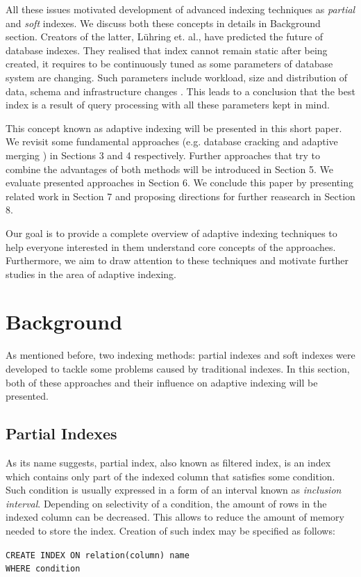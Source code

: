 \documentclass[10pt, conference, compsocconf]{IEEEtran}
\begin{document}
All these issues motivated development of advanced indexing techniques as \textit{partial} \cite{partial1} and \textit{soft} \cite{soft_indexes} indexes. We discuss both these concepts in details in Background section. Creators of the latter, L\"uhring et. al., have predicted the future of database indexes. They realised that index cannot remain static after being created, it requires to be continuously tuned as some parameters of database system are changing. Such parameters include workload, size and distribution of data, schema and infrastructure changes  \cite{soft_indexes}. This leads to a conclusion that the best index is a result of query processing with all these parameters kept in mind.

This concept known as adaptive indexing will be presented in this short paper. We revisit some fundamental approaches (e.g. database cracking \cite{cracking} and adaptive merging \cite{merging}) in Sections 3 and 4 respectively. Further approaches that try to combine the advantages of both methods will be introduced in Section 5. We evaluate presented approaches in Section 6. We conclude this paper by presenting related work in Section 7 and proposing directions for further reasearch in Section 8.

Our goal is to provide a complete overview of adaptive indexing techniques to help everyone interested in them understand core concepts of the approaches. Furthermore, we aim to draw attention to these techniques and motivate further studies in the area of adaptive indexing.

\section{Background}
As mentioned before, two indexing methods: partial indexes \cite{partial1} and soft indexes \cite{soft_indexes} were developed to tackle some problems caused by traditional indexes. In this section, both of these approaches and their influence on adaptive indexing will be presented.
\subsection{Partial Indexes}
As its name suggests, partial index, also known as filtered index, is an index which contains only part of the indexed column that satisfies some condition. Such condition is usually expressed in a form of an interval known as \textit{inclusion interval}. Depending on selectivity of a condition, the amount of rows in the indexed column can be decreased. This allows to reduce the amount of memory needed to store the index. Creation of such index may be specified as follows:
\begin{displayquote}
\texttt{CREATE \hspace{0.2 cm} INDEX \hspace{0.2 cm} ON \hspace{0.2 cm} relation(column) name \\ WHERE \hspace{0.2 cm} condition}
\end{displayquote}
\end{document}
